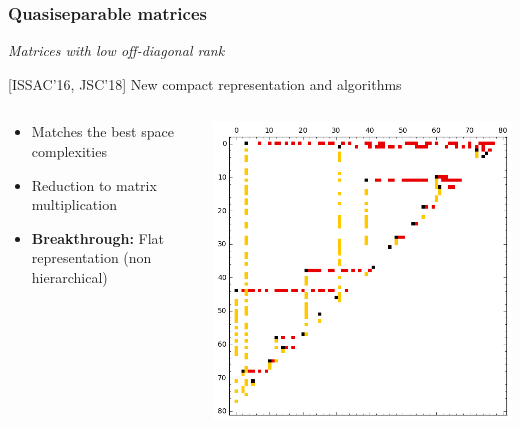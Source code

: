 \documentclass{beamer}
\begin{document}
\begin{frame}
  \frametitle{Quasiseparable matrices }
  \begin{center}
    \textit{Matrices with low off-diagonal rank}
  \end{center}

  \begin{block}
    {[ISSAC'16, JSC'18] New compact representation and algorithms}
  \begin{columns}
    \begin{column}{.75\textwidth}
    \begin{itemize}
    \item Matches the best space complexities%
    \item Reduction to matrix multiplication%
    \item \textbf{Breakthrough:} Flat representation (non hierarchical)
    \end{itemize}
    \end{column}
    \begin{column}{.2\textwidth}
      \includegraphics[width=\textwidth]{Bruhat}
    \end{column}
  \end{columns}
  \end{block}

\end{frame}
\end{document}
